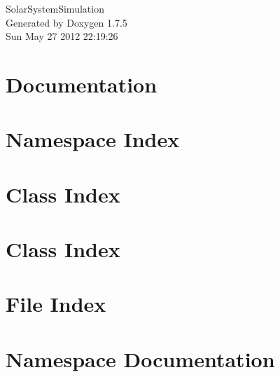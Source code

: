 \documentclass[a4paper]{book}
\begin{document}
\hypersetup{pageanchor=false,citecolor=blue}
\begin{titlepage}
\vspace*{7cm}
\begin{center}
{\Large \-Solar\-System\-Simulation }\\
\vspace*{1cm}
{\large \-Generated by Doxygen 1.7.5}\\
\vspace*{0.5cm}
{\small Sun May 27 2012 22:19:26}\\
\end{center}
\end{titlepage}
\clearemptydoublepage
{}
\tableofcontents
\clearemptydoublepage
{}
\hypersetup{pageanchor=true,citecolor=blue}
\chapter{\-Documentation}
\label{index}\hypertarget{index}{}
\chapter{\-Namespace \-Index}

\chapter{\-Class \-Index}

\chapter{\-Class \-Index}

\chapter{\-File \-Index}

\chapter{\-Namespace \-Documentation}

\end{document}
